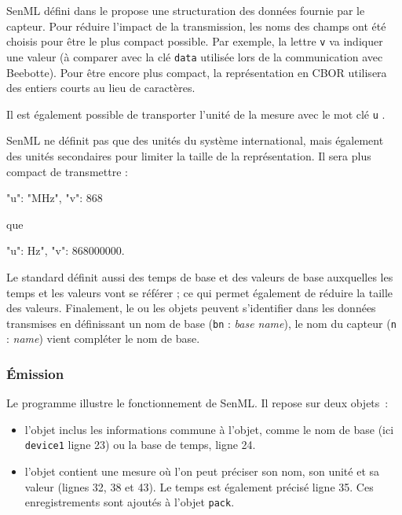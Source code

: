 \ac{SenML} défini dans le  propose une structuration des données fournie par le capteur. 
Pour réduire l’impact de la transmission, les noms des champs ont été choisis pour être le plus compact possible. 
Par exemple, la lettre \texttt{v}  va indiquer une valeur (à comparer avec la clé \texttt{data} utilisée lors de la communication avec Beebotte). 
Pour être encore plus compact, la représentation en CBOR utilisera des entiers courts au lieu de caractères.

       \vspace{1em}

Il est également possible de transporter l’unité de la mesure avec le mot clé \texttt{u} .


SenML ne définit pas que des unités  du système international, mais également des unités secondaires pour limiter la taille de la représentation. Il sera plus compact de transmettre :

\begin{termc}[backgroundcolor=\color{palerod}, basicstyle=\ttfamily\small, escapechar=\#]
{"u": "MHz", "v": 868}
\end{termc}

que
\begin{termc}[backgroundcolor=\color{palerod},  basicstyle=\ttfamily\small, escapechar=\#]
{"u": Hz", "v": 868000000}.
\end{termc}

Le standard définit aussi des temps de base et des valeurs de base auxquelles les temps et les valeurs vont se référer ; ce qui permet également de réduire la taille des valeurs. Finalement, le ou les objets peuvent s’identifier dans les données transmises en définissant un nom de base (\texttt{bn} : \textit{base name}), le nom du capteur (\texttt{n} : \textit{name}) vient compléter le nom de base.

\subsubsection{Émission}


Le programme  illustre le fonctionnement de SenML. Il repose sur deux objets~:
\begin{itemize}
\item l'objet  inclus les informations commune à l'objet, comme le nom de base (ici \texttt{device1} ligne 23) ou la base de temps, ligne 24.
\item l'objet  contient une mesure où l'on peut préciser son nom, son unité et sa valeur (lignes 32, 38 et 43). Le temps est également précisé ligne 35. Ces enregistrements sont ajoutés à l'objet \texttt{pack}.
\end{itemize}

